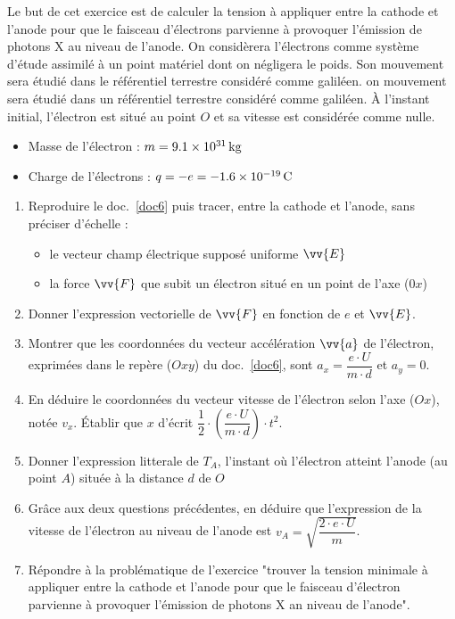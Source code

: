 \documentclass[a4paper,11pt,fleqn]{scrartcl}%
\begin{document}
Le but de cet exercice est de calculer la tension à appliquer entre la cathode et l'anode pour que le faisceau d'électrons parvienne à provoquer l'émission de photons X au niveau de l'anode. On considèrera l'électrons comme système d'étude assimilé à un point matériel dont on négligera le poids. Son mouvement sera étudié dans le référentiel terrestre considéré comme galiléen. on mouvement sera étudié dans un référentiel terrestre considéré comme galiléen. À l'instant initial, l'électron est situé au point $O$ et sa vitesse est considérée comme nulle.\\

\begin{data}
    \begin{itemize}
        \item Masse de l'électron : $m = \SI{9,1E31}{kg}$
        \item Charge de l'électrons : $q = -e = \SI{-1,6E-19}{C}$
    \end{itemize}
\end{data}

\begin{question}
    \begin{enumerate}
    \item Reproduire le doc.~\ref{doc6} puis tracer, entre la cathode et l'anode, sans préciser d'échelle :\begin{itemize}
        \item le vecteur champ électrique supposé uniforme $\vv{E}$
        \item la force $\vv{F}$ que subit un électron situé en un point de l'axe ($0x$)
    \end{itemize}
    \item Donner l'expression vectorielle de $\vv{F}$ en fonction de $e$ et $\vv{E}$.
    \item Montrer que les coordonnées du vecteur accélération $\vv{a}$ de l'électron, exprimées dans le repère ($Oxy$) du doc.~\ref{doc6}, sont $a_x = \dfrac{e\cdot U}{m \cdot d}$ et $a_y = 0$.
    \item En déduire le coordonnées du vecteur vitesse de l'électron selon l'axe ($Ox$), notée $v_x$. Établir que $x$ d'écrit $ \dfrac{1}{2} \cdot \left(\dfrac{e\cdot U}{m \cdot d}\right) \cdot t^2$.
    \item Donner l'expression litterale de $T_A$, l'instant où l'électron atteint l'anode (au point $A$) située à la distance $d$ de $O$
    \item Grâce aux deux questions précédentes, en déduire que l'expression de la vitesse de l'électron au niveau de l'anode est $v_A = \sqrt{\dfrac{2\cdot e \cdot U}{m}}$.
    \item Répondre à la problématique de l’exercice "trouver la tension minimale à appliquer entre la cathode et l’anode pour que le faisceau d’électron parvienne à provoquer l’émission de photons X an niveau de l’anode".
\end{enumerate}
\end{question}
\end{document}
